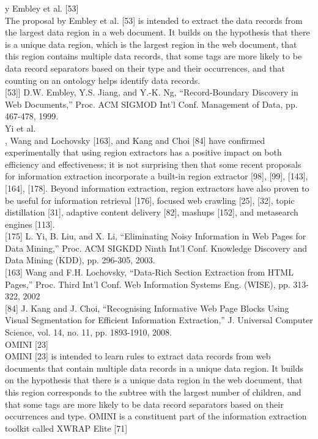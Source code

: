 y Embley et al. [53] \\
The proposal by Embley et al. [53] is intended to extract the
data records from the largest data region in a web document.
It builds on the hypothesis that there is a unique data region,
which is the largest region in the web document, that this
region contains multiple data records, that some tags are
more likely to be data record separators based on their
type and their occurrences, and that counting on an
ontology helps identify data records.\\

\cite{Embley} [53]] D.W. Embley, Y.S. Jiang, and Y.-K. Ng, “Record-Boundary
Discovery in Web Documents,” Proc. ACM SIGMOD Int’l Conf.
Management of Data, pp. 467-478, 1999.\\

Yi et al.\\
[175], Wang and Lochovsky [163], and Kang and Choi [84]
have confirmed experimentally that using region extractors
has a positive impact on both efficiency and effectiveness; it
is not surprising then that some recent proposals for
information extraction incorporate a built-in region extractor
[98], [99], [143], [164], [178]. Beyond information
extraction, region extractors have also proven to be useful
for information retrieval [176], focused web crawling [25],
[32], topic distillation [31], adaptive content delivery [82],
mashups [152], and metasearch engines [113].\\

\cite{Noisy}[175] L. Yi, B. Liu, and X. Li, “Eliminating Noisy Information in Web
Pages for Data Mining,” Proc. ACM SIGKDD Ninth Int’l Conf.
Knowledge Discovery and Data Mining (KDD), pp. 296-305, 2003. \\

\cite{Wang}[163] Wang and F.H. Lochovsky, “Data-Rich Section Extraction from
HTML Pages,” Proc. Third Int’l Conf. Web Information Systems Eng.
(WISE), pp. 313-322, 2002\\

\cite{Kang} [84] J. Kang and J. Choi, “Recognising Informative Web Page Blocks
Using Visual Segmentation for Efficient Information Extraction,”
J. Universal Computer Science, vol. 14, no. 11, pp. 1893-1910, 2008.\\

OMINI [23] \\
OMINI [23] is intended to learn rules to extract data records
from web documents that contain multiple data records in a
unique data region. It builds on the hypothesis that there is
a unique data region in the web document, that this region
corresponds to the subtree with the largest number of
children, and that some tags are more likely to be data
record separators based on their occurrences and type.
OMINI is a constituent part of the information extraction
toolkit called XWRAP Elite [71]\\

